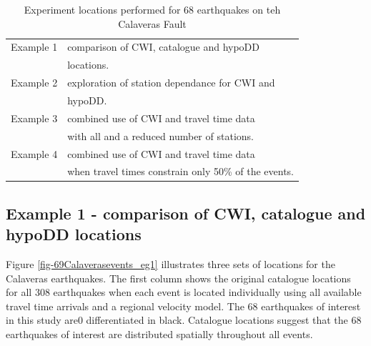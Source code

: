 \documentclass[extra]{gji}
\begin{document}
\begin{table}
\caption{Experiment locations performed for 68 earthquakes on teh
Calaveras Fault} \label{tab:examples}
\begin{tabular}{ll}
\hline
Example 1 & comparison of CWI, catalogue and hypoDD \\
 & locations. \\
Example 2 & exploration of station dependance for CWI and \\
 & hypoDD. \\
Example 3 & combined use of CWI and travel time data \\
& with all and a reduced number of stations. \\
Example 4 & combined use of CWI and travel time data \\
 & when travel times constrain only 50\% of the events. \\
 \hline
\end{tabular}
\end{table}



\subsection{Example 1 - comparison of CWI, catalogue and hypoDD locations}

Figure \ref{fig-69Calaverasevents_eg1} illustrates three sets of
locations for the Calaveras earthquakes. The first column shows the
original catalogue locations for all 308 earthquakes when each event
is located individually using all available travel time arrivals and
a regional velocity model. The 68 earthquakes of interest in this
study are0 differentiated in black. Catalogue locations suggest that
the 68 earthquakes of interest are distributed spatially throughout
all events.

\end{document}
